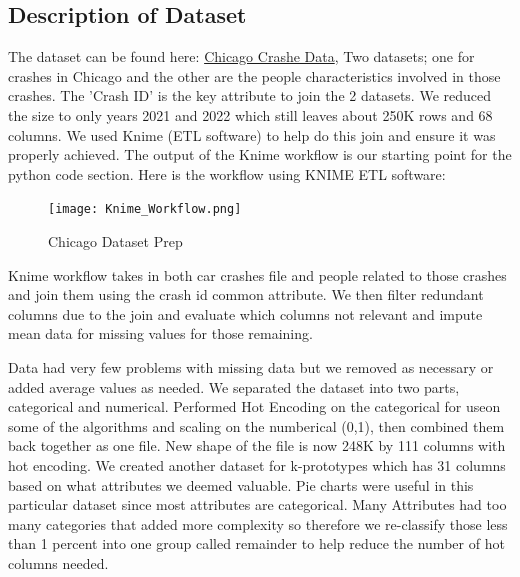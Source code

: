 \documentclass[conference]{IEEEtran}
\begin{document}
\subsection{Description of Dataset}
The dataset can be found here: \href{https://data.cityofchicago.org/Transportation/Traffic-Crashes-Crashes/85ca-t3if}{Chicago Crashe Data}, Two datasets; one for crashes in Chicago and the other are the people characteristics involved in those crashes.  The 'Crash ID' is the key attribute to join the 2 datasets.  We reduced the size to only years 2021 and 2022 which still leaves about 250K rows and 68 columns.  We used Knime (ETL software) to help do this join and ensure it was properly achieved. The output of the Knime workflow is our starting point for the python code section.
Here is the workflow using KNIME ETL software:
\begin{figure}[!h]
	\texttt{[image: Knime\_Workflow.png]}
	\caption{Chicago Dataset Prep}
	\label{fig: KNIME ETL for Chicago Dataset for Crashes and People involved}
 \end{figure}

 Knime workflow takes in both car crashes file and people related to those crashes and join them using the crash id common attribute.  We then filter redundant columns due to the join and evaluate which columns not relevant and impute mean data for missing values for those remaining.

Data had very few problems with missing data but we removed as necessary or added average values as needed. We separated the dataset into two parts, categorical and numerical.  Performed Hot Encoding on the categorical for useon some of the algorithms and scaling on the numberical (0,1), then combined them back together as one file.  New shape of the file is now  248K by 111 columns with hot encoding. We created another dataset for k-prototypes which has 31 columns based on what attributes we deemed valuable.  Pie charts were useful in this particular dataset since most attributes are categorical.  Many Attributes had too many categories that added more complexity so therefore we re-classify those less than 1 percent into one group called remainder to help reduce the number of hot columns needed. \linebreak
\end{document}
